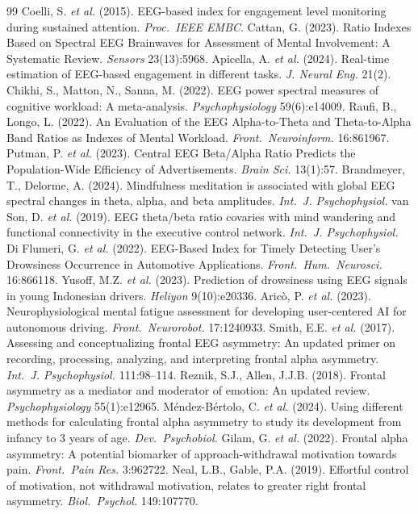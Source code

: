 \documentclass[11pt,a4paper]{article}
\begin{document}
\vspace{+70pt}
\begin{thebibliography}{99}
\footnotesize
{} Coelli, S. \emph{et al.} (2015). EEG-based index for engagement level monitoring during sustained attention. \emph{Proc.\ IEEE EMBC}.
 Cattan, G. (2023). Ratio Indexes Based on Spectral EEG Brainwaves for Assessment of Mental Involvement: A Systematic Review. \emph{Sensors} 23(13):5968.
 Apicella, A. \emph{et al.} (2024). Real-time estimation of EEG-based engagement in different tasks. \emph{J. Neural Eng.} 21(2).
 Chikhi, S., Matton, N., Sanna, M. (2022). EEG power spectral measures of cognitive workload: A meta-analysis. \emph{Psychophysiology} 59(6):e14009.
 Raufi, B., Longo, L. (2022). An Evaluation of the EEG Alpha-to-Theta and Theta-to-Alpha Band Ratios as Indexes of Mental Workload. \emph{Front.\ Neuroinform.} 16:861967.
 Putman, P. \emph{et al.} (2023). Central EEG Beta/Alpha Ratio Predicts the Population-Wide Efficiency of Advertisements. \emph{Brain Sci.} 13(1):57.
 Brandmeyer, T., Delorme, A. (2024). Mindfulness meditation is associated with global EEG spectral changes in theta, alpha, and beta amplitudes. \emph{Int.\ J. Psychophysiol.}
 van Son, D. \emph{et al.} (2019). EEG theta/beta ratio covaries with mind wandering and functional connectivity in the executive control network. \emph{Int.\ J. Psychophysiol.}
 Di Flumeri, G. \emph{et al.} (2022). EEG-Based Index for Timely Detecting User's Drowsiness Occurrence in Automotive Applications. \emph{Front.\ Hum.\ Neurosci.} 16:866118.
 Yusoff, M.Z. \emph{et al.} (2023). Prediction of drowsiness using EEG signals in young Indonesian drivers. \emph{Heliyon} 9(10):e20336.
 Aricò, P. \emph{et al.} (2023). Neurophysiological mental fatigue assessment for developing user-centered AI for autonomous driving. \emph{Front.\ Neurorobot.} 17:1240933.
 Smith, E.E. \emph{et al.} (2017). Assessing and conceptualizing frontal EEG asymmetry: An updated primer on recording, processing, analyzing, and interpreting frontal alpha asymmetry. \emph{Int.\ J. Psychophysiol.} 111:98--114.
 Reznik, S.J., Allen, J.J.B. (2018). Frontal asymmetry as a mediator and moderator of emotion: An updated review. \emph{Psychophysiology} 55(1):e12965.
 Méndez-Bértolo, C. \emph{et al.} (2024). Using different methods for calculating frontal alpha asymmetry to study its development from infancy to 3 years of age. \emph{Dev.\ Psychobiol.}
 Gilam, G. \emph{et al.} (2022). Frontal alpha asymmetry: A potential biomarker of approach-withdrawal motivation towards pain. \emph{Front.\ Pain Res.} 3:962722.
 Neal, L.B., Gable, P.A. (2019). Effortful control of motivation, not withdrawal motivation, relates to greater right frontal asymmetry. \emph{Biol.\ Psychol.} 149:107770.
\end{thebibliography}
\end{document}
